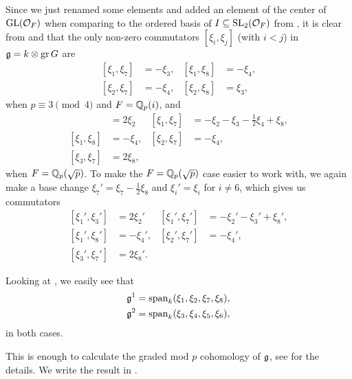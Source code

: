 Since we just renamed some elements and added an element of the center of $\operatorname{GL}(\mathcal{O}_{F})$ when comparing to the ordered basis of $I \subseteq \operatorname{SL}_{2}(\mathcal{O}_{F})$ from , it is clear from  and  that the only non-zero commutators $[\xi_{i},\xi_{j}]$  (with $i<j$) in  $\mathfrak{g} = k \otimes \operatorname{gr} G$ are
\begin{equation}
  \label{eq:xi_ij-GL2-F-unram}
  \begin{aligned}
    [\xi_{1},\xi_{7}] &= -\xi_{3}, & [\xi_{1},\xi_{8}] &= -\xi_{4}, \\
    [\xi_{2},\xi_{7}] &= -\xi_{4}, & [\xi_{2},\xi_{8}] &= \xi_{3},
  \end{aligned}
\end{equation}
when $p\equiv3 \pmod{4}$ and $F = \mathbb{Q}_{p}(i)$, and
\begin{align*}
  [\xi_{1},\xi_{3}] &= 2\xi_{2} & [\xi_{1},\xi_{7}] &= -\xi_{2} - \xi_{3} - \frac{1}{2}\xi_{4} + \xi_{8}, \\
  [\xi_{1},\xi_{8}] &= -\xi_{4}, & [\xi_{2},\xi_{7}] &= -\xi_{4}, \\
  [\xi_{3},\xi_{7}] &= 2\xi_{8},
\end{align*}
when $F = \mathbb{Q}_{p}(\sqrt{p})$. To make the $F = \mathbb{Q}_{p}(\sqrt{p})$ case easier to work with, we again make a base change $\xi_{7}' = \xi_{7} - \frac{1}{2}\xi_{8}$ and $\xi_{i}' = \xi_{i}$ for $i \neq 6$, which gives us commutators
\begin{equation}
  \label{eq:xi_ij-GL2-F-ram}
  \begin{aligned}
    [\xi_{1}',\xi_{3}'] &= 2\xi_{2}' & [\xi_{1}',\xi_{7}'] &= -\xi_{2}' - \xi_{3}' + \xi_{8}', \\
    [\xi_{1}',\xi_{8}'] &= -\xi_{4}', & [\xi_{2}',\xi_{7}'] &= -\xi_{4}', \\
    [\xi_{3}',\xi_{7}'] &= 2\xi_{8}'.
  \end{aligned}
\end{equation}

Looking at , we easily see that
\begin{align*}
  \mathfrak{g}^{1} &= \operatorname{span}_{k}(\xi_{1},\xi_{2},\xi_{7},\xi_{8}), \\
  \mathfrak{g}^{2} &= \operatorname{span}_{k}(\xi_{3},\xi_{4},\xi_{5},\xi_{6}),
\end{align*}
in both cases.

This is enough to calculate the graded mod $p$ cohomology of $\mathfrak{g}$, see \cite{code} for the details. We write the result in .

